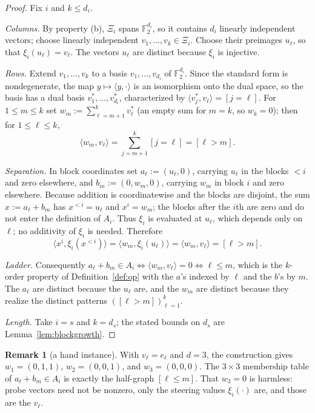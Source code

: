 \documentclass[11pt]{article}
\theoremstyle{plain}
\theoremstyle{definition}
\newtheorem{remark}[theorem]{Remark}
\numberwithin{theorem}{section}
\newcommand{\F}{\mathbb{F}}
\newcommand{\inner}[2]{\langle #1,#2\rangle}
\newcommand{\Xii}{\Xi}
\begin{document}
\begin{proof}
Fix $i$ and $k\le d_i$.

\emph{Columns.} By property (b), $\Xii_i$ spans $\F_2^{d_i}$, so it contains
$d_i$ linearly independent vectors; choose linearly independent
$v_1,\dots,v_k\in\Xii_i$.  Choose their preimages $u_\ell$, so that
$\xi_i(u_\ell)=v_\ell$.  The vectors $u_\ell$ are distinct because $\xi_i$
is injective.

\emph{Rows.} Extend $v_1,\dots,v_k$ to a basis $v_1,\dots,v_{d_i}$ of
$\F_2^{d_i}$. Since the standard form is nondegenerate, the map
$y\mapsto\inner{y}{\cdot}$ is an isomorphism onto the dual space, so the basis
has a dual basis $v_1^{*},\dots,v_{d_i}^{*}$, characterized by
$\inner{v_j^{*}}{v_\ell}=[j=\ell]$. For $1\le m\le k$ set
$w_m:=\sum_{\ell=m+1}^{k}v_\ell^{*}$ (an empty sum for $m=k$, so $w_k=0$);
then for $1\le\ell\le k$,
\[
  \inner{w_m}{v_\ell}=\sum_{j=m+1}^{k}[j=\ell]=[\ell>m].
\]

\emph{Separation.} In block coordinates set $a_\ell:=(u_\ell,0)$, carrying
$u_\ell$ in the blocks $<i$ and zero elsewhere, and $b_m:=(0,w_m,0)$, carrying
$w_m$ in block $i$ and zero elsewhere. Because addition is coordinatewise and
the blocks are disjoint, the sum $x:=a_\ell+b_m$ has $x^{<i}=u_\ell$ and
$x^i=w_m$; the blocks after the $i$th are zero and do not enter the definition
of $A_i$. Thus $\xi_i$ is evaluated at $u_\ell$, which depends only on $\ell$; no
additivity of $\xi_i$ is needed. Therefore
\[
  \inner{x^i}{\xi_i(x^{<i})}=\inner{w_m}{\xi_i(u_\ell)}
  =\inner{w_m}{v_\ell}=[\ell>m].
\]

\emph{Ladder.} Consequently $a_\ell+b_m\in A_i\iff\inner{w_m}{v_\ell}=0\iff
\ell\le m$, which is the $k$-order property of Definition~\ref{def:op} with the
$a$'s indexed by $\ell$ and the $b$'s by $m$. The $a_\ell$ are distinct because
the $u_\ell$ are, and the $w_m$ are distinct because they realize the distinct
patterns $([\ell>m])_{\ell=1}^{k}$.

\emph{Length.} Take $i=s$ and $k=d_s$; the stated bounds on $d_s$ are
Lemma~\ref{lem:blockgrowth}.
\end{proof}

\begin{remark}[a hand instance]\label{rem:hand}
With $v_\ell=e_\ell$ and $d=3$, the construction gives
$w_1=(0,1,1)$, $w_2=(0,0,1)$, and $w_3=(0,0,0)$.  The $3\times3$ membership
table of $a_\ell+b_m\in A_i$ is
exactly the half-graph $[\ell\le m]$. That $w_3=0$ is harmless: probe vectors
need not be nonzero, only the steering values $\xi_i(\cdot)$ are, and those are
the $v_\ell$.
\end{remark}
\end{document}
